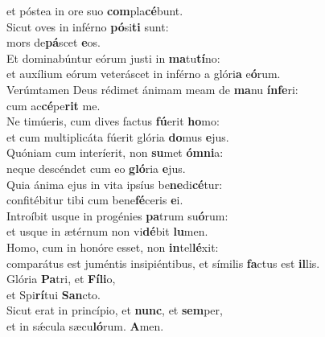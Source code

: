 \oddverse et póstea in ore suo \textbf{com}pla\textbf{cé}bunt.\\
\evenverse Sicut oves in inférno \textbf{pó}si\textbf{ti} sunt:~\*\\
\evenverse mors de\textbf{pá}scet \textbf{e}os.\\
\oddverse Et dominabúntur eórum justi in \textbf{ma}tu\textbf{tí}no:~\*\\
\oddverse et auxílium eórum veteráscet in inférno a glóri\textbf{a} e\textbf{ó}rum.\\
\evenverse Verúmtamen Deus rédimet ánimam meam de \textbf{ma}nu \textbf{ín}\textbf{fe}ri:~\*\\
\evenverse cum ac\textbf{cé}pe\textbf{rit} me.\\
\oddverse Ne timúeris, cum dives factus \textbf{fú}erit \textbf{ho}mo:~\*\\
\oddverse et cum multiplicáta fúerit glória \textbf{do}mus \textbf{e}jus.\\
\evenverse Quóniam cum interíerit, non \textbf{su}met \textbf{óm}\textbf{ni}a:~\*\\
\evenverse neque descéndet cum eo \textbf{gló}ria \textbf{e}jus.\\
\oddverse Quia ánima ejus in vita ipsíus be\textbf{ne}di\textbf{cé}tur:~\*\\
\oddverse confitébitur tibi cum bene\textbf{fé}ceris \textbf{e}i.\\
\evenverse Introíbit usque in progénies \textbf{pa}trum su\textbf{ó}rum:~\*\\
\evenverse et usque in ætérnum non vi\textbf{dé}bit \textbf{lu}men.\\
\oddverse Homo, cum in honóre esset, non \textbf{in}tel\textbf{lé}xit:~\*\\
\oddverse comparátus est juméntis insipiéntibus, et símilis \textbf{fa}ctus est \textbf{il}lis.\\
\evenverse Glória \textbf{Pa}tri, et \textbf{Fí}\textbf{li}o,~\*\\
\evenverse et Spi\textbf{rí}tui \textbf{San}cto.\\
\oddverse Sicut erat in princípio, et \textbf{nunc}, et \textbf{sem}per,~\*\\
\oddverse et in sǽcula sæcu\textbf{ló}rum. \textbf{A}men.\\

